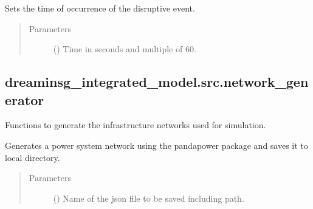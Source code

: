 \documentclass[letterpaper,10pt,english]{sphinxmanual}
\begin{document}
\begin{fulllineitems}
\begin{fulllineitems}
\label{\detokenize{apidoc:dreaminsg_integrated_model.src.hazard_initiator.TrackDisruption.set_time_of_occurrence}}
\sphinxAtStartPar
Sets the time of occurrence of the disruptive event.
\begin{quote}\begin{description}
\item[{Parameters}] \leavevmode
\sphinxAtStartPar
{} () \textendash{} Time in seconds and multiple of 60.

\end{description}\end{quote}

\end{fulllineitems}


\end{fulllineitems}



\subsection{dreaminsg\_integrated\_model.src.network\_generator}
\label{\detokenize{apidoc:module-dreaminsg_integrated_model.src.network_generator}}\label{\detokenize{apidoc:dreaminsg-integrated-model-src-network-generator}}
\sphinxAtStartPar
Functions to generate the infrastructure networks used for simulation.

\begin{fulllineitems}
\label{\detokenize{apidoc:dreaminsg_integrated_model.src.network_generator.generate_powern}}
\sphinxAtStartPar
Generates a power system network using the pandapower package and saves it to local directory.
\begin{quote}\begin{description}
\item[{Parameters}] \leavevmode
\sphinxAtStartPar
{} () \textendash{} Name of the json file to be saved including path.

\end{description}\end{quote}

\end{fulllineitems}
\end{document}
